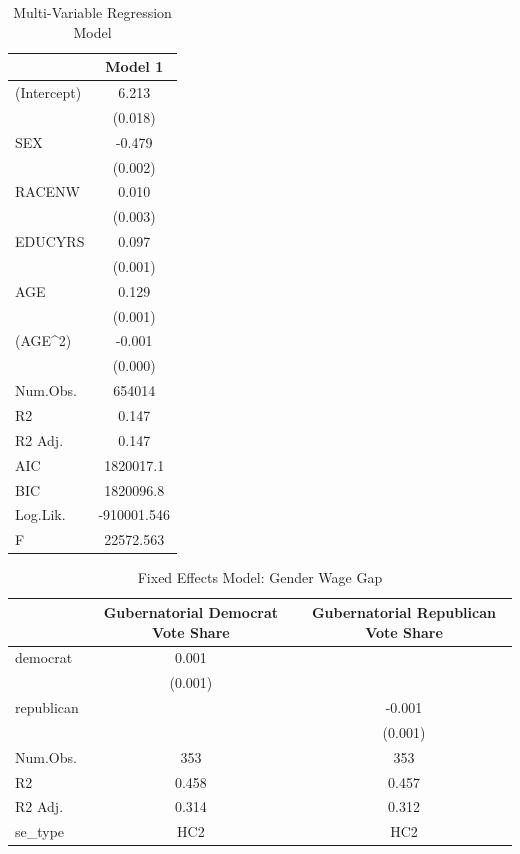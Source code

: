 \documentclass[12pt, English]{article}
\begin{document}
\begin{table}[htp]
\centering %
    \caption{Multi-Variable Regression Model}
    \vspace{7.5mm} %
\begin{tabular}[t]{lc}
\toprule
  & Model 1\\
\midrule
(Intercept) & 6.213\\
 & (0.018)\\
SEX & -0.479\\
 & (0.002)\\
RACENW & 0.010\\
 & (0.003)\\
EDUCYRS & 0.097\\
 & \vphantom{1} (0.001)\\
AGE & 0.129\\
 & (0.001)\\
(AGE\textasciicircum{}2) & -0.001\\
 & (0.000)\\
\midrule
Num.Obs. & 654014\\
R2 & 0.147\\
R2 Adj. & 0.147\\
AIC & 1820017.1\\
BIC & 1820096.8\\
Log.Lik. & -910001.546\\
F & 22572.563\\
\bottomrule
\end{tabular}
\end{table}



\newpage

\begin{table}[htp]
\centering %
    \caption{Fixed Effects Model: Gender Wage Gap}
    \vspace{7.5mm} %
\begin{tabular}[t]{lcc}
\toprule
  & Gubernatorial Democrat Vote Share & Gubernatorial Republican Vote Share \\
\midrule
democrat & 0.001 & \\
 & (0.001) & \\
republican &  & -0.001\\
 &  & (0.001)\\
\midrule
Num.Obs. & 353 & 353\\
R2 & 0.458 & 0.457\\
R2 Adj. & 0.314 & 0.312\\
se\_type & HC2 & HC2\\
\bottomrule
\end{tabular}
\end{table}



\newpage
\end{document}
